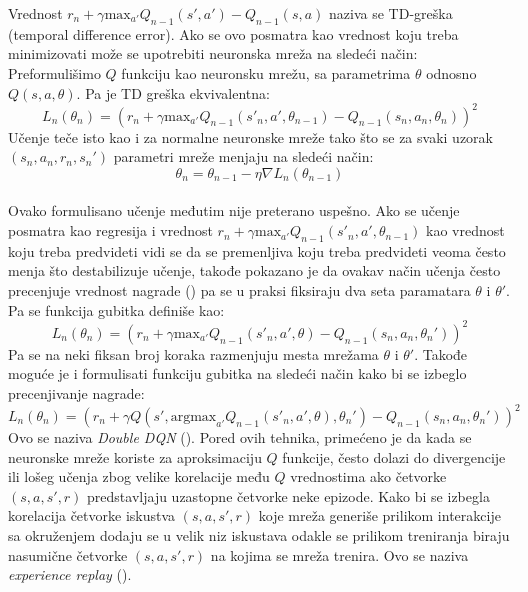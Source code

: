 \documentclass[a4paper,fleqn,12pt]{JMThesis}
\newcommand{\latin}{\fontencoding{T1}\selectfont\selectlanguage{english}}
\theoremstyle{plain}
\theoremstyle{definition}
\theoremstyle{definition}
\begin{document}
Vrednost $r_n + \gamma \text{max}_{a'}Q_{n-1}(s',a') - Q_{n-1}(s,a)$ naziva se TD-greška (temporal difference error). Ako se ovo
posmatra kao vrednost koju treba minimizovati može se upotrebiti neuronska mreža na sledeći način:
Preformulišimo $Q$ funkciju kao neuronsku mrežu, sa parametrima $\theta$ odnosno $Q(s,a,\theta)$. Pa je TD greška ekvivalentna:
\[L_n(\theta_n) = (r_n + \gamma \text{max}_{a'}Q_{n-1}(s'_n,a',\theta_{n-1}) - Q_{n-1}(s_n,a_n,\theta_n))^2 \]
Učenje teče isto kao i za normalne neuronske mreže tako što se za svaki uzorak $(s_n,a_n,r_n,s_n')$ parametri mreže menjaju na sledeći način:
\[ \theta_n = \theta_{n-1} - \eta  \nabla L_n(\theta_{n-1}) \]
\medskip\\
Ovako formulisano učenje međutim nije preterano uspešno. Ako se učenje posmatra kao regresija i vrednost $r_n + \gamma \text{max}_{a'}Q_{n-1}(s'_n,a',\theta_{n-1})$ 
kao vrednost koju treba predvideti vidi se da se premenljiva koju treba predvideti veoma često menja što destabilizuje učenje, takođe
pokazano je da ovakav način učenja često precenjuje vrednost nagrade (\latin \cite{van2016deep}) pa
se u praksi fiksiraju dva seta paramatara $\theta$ i $\theta'$. Pa se funkcija gubitka definiše kao:
\[L_n(\theta_n) = (r_n + \gamma \text{max}_{a'}Q_{n-1}(s'_n,a',\theta) - Q_{n-1}(s_n,a_n,\theta_n'))^2 \]
Pa se na neki fiksan broj koraka razmenjuju mesta mrežama $\theta$ i $\theta'$.
Takođe moguće je i formulisati funkciju gubitka na sledeći način kako bi se izbeglo precenjivanje nagrade:
\[L_n(\theta_n) = (r_n + \gamma Q(s',\text{argmax}_{a'}Q_{n-1}(s'_n,a',\theta),\theta_n') - Q_{n-1}(s_n,a_n,\theta_n'))^2 \]
Ovo se naziva \textit{Double DQN} (\latin \cite{van2016deep}).
Pored ovih tehnika, primećeno je da kada se neuronske mreže koriste za aproksimaciju $Q$ funkcije, često dolazi do divergencije ili
lošeg učenja zbog velike korelacije među $Q$ vrednostima ako četvorke $(s,a,s',r)$ predstavljaju uzastopne četvorke neke epizode.
Kako bi se izbegla korelacija četvorke iskustva $(s,a,s',r)$ koje mreža generiše prilikom interakcije sa okruženjem dodaju se 
u velik niz iskustava odakle se prilikom treniranja biraju nasumične četvorke $(s,a,s',r)$ na kojima se mreža trenira. Ovo se naziva
\textit{experience replay} (\latin \cite{mnih2015human}).
\renewcommand\bibname{ Literatura}
\latin
\printbibliography[title=Literatura]
\medskip
\end{document}
